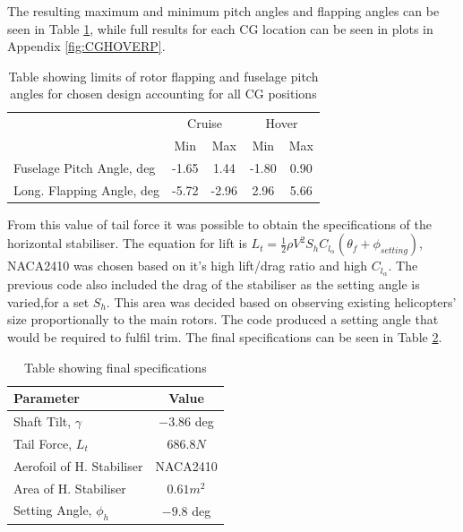 \documentclass[11pt,a4paper]{article}
\begin{document}
The resulting maximum and minimum pitch angles and flapping angles can be seen in Table \ref{tab:cgres}, while full results for each CG location can be seen in plots in Appendix \ref{fig:CGHOVERP}.
\begin{table}[H]
\centering
\caption{Table showing limits of rotor flapping and fuselage pitch angles for chosen design accounting for all CG positions}
\begin{tabular}{c|c|c|c|c|}
\cline{2-5}
                                                & \multicolumn{2}{c}{\cellcolor[HTML]{DAE8FC}Cruise}                             & \multicolumn{2}{c|}{\cellcolor[HTML]{DAE8FC}Hover}        \\ \cline{2-5} 
                                                & \multicolumn{1}{c|}{\cellcolor[HTML]{DAE8FC}Min} & \cellcolor[HTML]{DAE8FC}Max & \cellcolor[HTML]{DAE8FC}Min & \cellcolor[HTML]{DAE8FC}Max \\ \hline
\multicolumn{1}{|l|}{Fuselage Pitch Angle, deg} & \multicolumn{1}{c|}{-1.65}                       & 1.44                        & -1.80                       & 0.90                        \\ \hline
\multicolumn{1}{|l|}{Long. Flapping Angle, deg} & \multicolumn{1}{c|}{-5.72}                       & -2.96                       & 2.96                        & 5.66                        \\ \hline
\end{tabular}
\label{tab:cgres}
\end{table}
From this value of tail force it was possible to obtain the specifications of the horizontal stabiliser. The equation for lift is $L_t=\frac{1}{2}\rho V^2 S_h C_{l_\alpha}(\theta_f+\phi_{setting})$, NACA2410 was chosen based on it's high lift/drag ratio and high $C_{l_\alpha}$. The previous code also included the drag of the stabiliser as the setting angle is varied,for a set $S_h$. This area was decided based on observing existing helicopters' size proportionally to the main rotors. The code produced a setting angle that would be required to fulfil trim. The final specifications can be seen in Table \ref{tab:longfinal}.

\begin{table}[H]
\centering 
    \caption{Table showing final specifications}
\begin{tabular}{lc}
\hline
  \rowcolor[HTML]{DAE8FC} 
  Parameter & Value \\ \hline
   Shaft Tilt, $\gamma$ & $-3.86$ deg\\
   Tail Force, $L_t$ & $686.8N$\\
   Aerofoil of H. Stabiliser & NACA2410\\
   Area of H. Stabiliser & $0.61m^2$\\
   Setting Angle, $\phi_h$ & $-9.8$ deg\\
   \hline
\end{tabular}{}
    \label{tab:longfinal}
\end{table}{}
\end{document}
